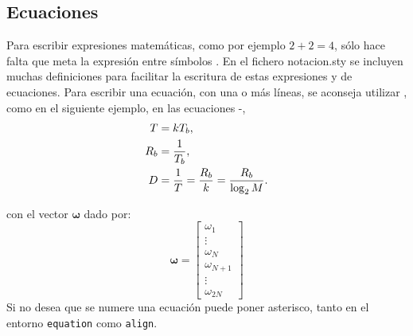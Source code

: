 \subsection{Ecuaciones}%
Para escribir expresiones matemáticas, como por ejemplo $2+2=4$, sólo hace falta que meta la expresión entre símbolos \ttcolor{\$}. En el fichero notacion.sty se incluyen muchas definiciones para facilitar la escritura de estas expresiones y de ecuaciones. Para escribir una ecuación, con una o más líneas, se aconseja utilizar , como en el siguiente ejemplo, en las ecuaciones -,
\begin{align}
 T     &=kT_b  \LABEQ{Eq1}, \\
 R_b&=\frac{1}{T_b }	, \\
 D    &=\frac{1}{T}=\frac{R_b }{k}=\frac{R_b}{\log_2 M}. \LABEQ{Eq3}
\end{align}
%

con el vector $\bm{\omega}$ dado por:
\begin{equation}\label{eq02-y410}
\bm{\omega}=\begin{bmatrix}
\omega_{1}\\
\vdots \\
\omega_{N}\\
\omega_{N+1}\\
\vdots \\
\omega_{2N}
\end{bmatrix}
\end{equation}
Si no desea que se numere una ecuación puede poner asterisco, tanto en el entorno \verb+equation+ como \verb+align+.


